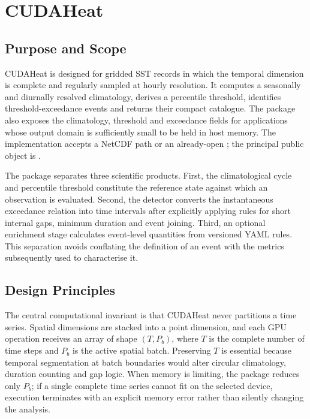 \section{CUDAHeat}

\subsection{Purpose and Scope}

CUDAHeat is designed for gridded SST records in which the temporal dimension is complete and regularly sampled at hourly resolution. It computes a seasonally and diurnally resolved climatology, derives a percentile threshold, identifies threshold-exceedance events and returns their compact catalogue. The package also exposes the climatology, threshold and exceedance fields for applications whose output domain is sufficiently small to be held in host memory. The implementation accepts a NetCDF path or an already-open ; the principal public object is .

The package separates three scientific products. First, the climatological cycle and percentile threshold constitute the reference state against which an observation is evaluated. Second, the detector converts the instantaneous exceedance relation into time intervals after explicitly applying rules for short internal gaps, minimum duration and event joining. Third, an optional enrichment stage calculates event-level quantities from versioned YAML rules. This separation avoids conflating the definition of an event with the metrics subsequently used to characterise it.

\subsection{Design Principles}

The central computational invariant is that CUDAHeat never partitions a time series. Spatial dimensions are stacked into a point dimension, and each GPU operation receives an array of shape $(T, P_b)$, where $T$ is the complete number of time steps and $P_b$ is the active spatial batch. Preserving $T$ is essential because temporal segmentation at batch boundaries would alter circular climatology, duration counting and gap logic. When memory is limiting, the package reduces only $P_b$; if a single complete time series cannot fit on the selected device, execution terminates with an explicit memory error rather than silently changing the analysis.

